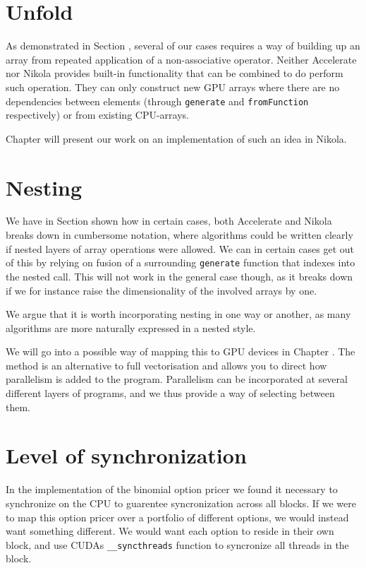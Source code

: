 \section{Unfold}
As demonstrated in Section , several of our cases requires a
way of building up an array from repeated application of a
non-associative operator. Neither Accelerate nor Nikola provides
built-in functionality that can be combined to do perform such
operation. They can only construct new GPU arrays where there are no
dependencies between elements (through \texttt{generate} and
\texttt{fromFunction} respectively) or from existing CPU-arrays.

Chapter  will present our work on an implementation of such
an idea in Nikola.

\section{Nesting}
We have in Section  shown how in certain cases, both
Accelerate and Nikola breaks down in cumbersome notation, where
algorithms could be written clearly if nested layers of array
operations were allowed. We can in certain cases get out of this by
relying on fusion of a surrounding \texttt{generate} function that
indexes into the nested call. This will not work in the general case
though, as it breaks down if we for instance raise the dimensionality
of the involved arrays by one.

We argue that it is worth incorporating nesting in one way or another,
as many algorithms are more naturally expressed in a nested style. 

We will go into a possible way of mapping this to GPU devices in
Chapter . The method is an alternative to full vectorisation
and allows you to direct how parallelism is added to the
program. Parallelism can be incorporated at several different layers
of programs, and we thus provide a way of selecting between them.

\section{Level of synchronization}
In the implementation of the binomial option pricer we found it
necessary to synchronize on the CPU to guarentee syncronization across
all blocks. If we were to map this option pricer over a portfolio of
different options, we would instead want something different. We would
want each option to reside in their own block, and use CUDAs
\texttt{__syncthreads} function to syncronize all threads in the
block.


